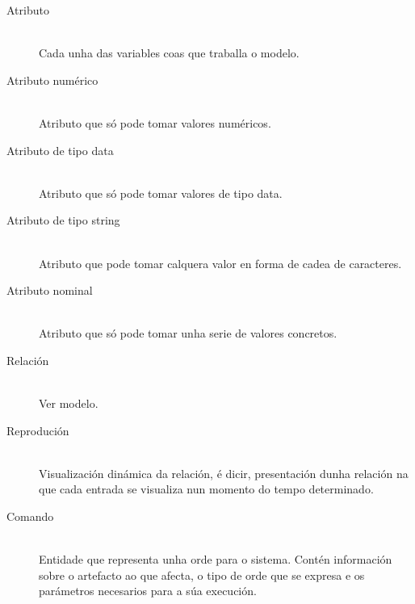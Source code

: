 \begin{description}
	\item[Atributo] \hfill \\
  Cada unha das variables coas que traballa o modelo.
	\item[Atributo numérico] \hfill \\
  Atributo que só pode tomar valores numéricos.
	\item[Atributo de tipo data] \hfill \\
  Atributo que só pode tomar valores de tipo data.
	\item[Atributo de tipo string] \hfill \\
  Atributo que pode tomar calquera valor en forma de cadea de caracteres.
	\item[Atributo nominal] \hfill \\
  Atributo que só pode tomar unha serie de valores concretos.
	\item[Relación] \hfill \\
 Ver modelo.
\item[Reprodución] \hfill \\
 Visualización dinámica da relación, é dicir, presentación dunha relación na que cada entrada se visualiza nun momento do tempo determinado.
\item[Comando] \hfill \\
 Entidade que representa unha orde para o sistema. Contén información sobre o artefacto ao que afecta, o tipo de orde que se expresa e os parámetros necesarios para a súa execución.
\end{description}